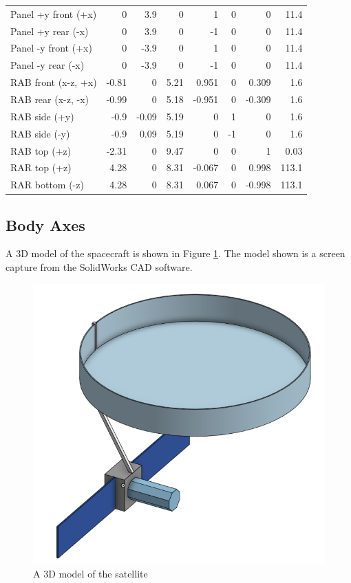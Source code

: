 \begin{longtable}{l|r|r|r|r|r|r|r}
Panel +y front (+x)            & 0     & 3.9   & 0     & 1      & 0      & 0      & 11.4  \\
Panel +y rear (-x)             & 0     & 3.9   & 0     & -1     & 0      & 0      & 11.4  \\
Panel -y front (+x)            & 0     & -3.9  & 0     & 1      & 0      & 0      & 11.4  \\
Panel -y rear (-x)             & 0     & -3.9  & 0     & -1     & 0      & 0      & 11.4  \\
RAB front (x-z, +x)            & -0.81 & 0     & 5.21  & 0.951  & 0      & 0.309  & 1.6   \\
RAB rear (x-z, -x)             & -0.99 & 0     & 5.18  & -0.951 & 0      & -0.309 & 1.6   \\
RAB side (+y)                  & -0.9  & -0.09 & 5.19  & 0      & 1      & 0      & 1.6   \\
RAB side (-y)                  & -0.9  & 0.09  & 5.19  & 0      & -1     & 0      & 1.6   \\
RAB top (+z)                   & -2.31 & 0     & 9.47  & 0      & 0      & 1      & 0.03  \\
RAR top (+z)                   & 4.28  & 0     & 8.31  & -0.067 & 0      & 0.998  & 113.1 \\
RAR bottom (-z)                & 4.28  & 0     & 8.31  & 0.067  & 0      & -0.998 & 113.1
\end{longtable}

\subsection{Body Axes}
A 3D model of the spacecraft is shown in Figure \ref{fig:complex_model}. The model shown is a screen capture from the SolidWorks CAD software.

\begin{figure}[H]
\centering
\includegraphics[scale=0.4]{Images/ps1_complex_model.png}
\caption{A 3D model of the satellite}
\label{fig:complex_model}
\end{figure}



